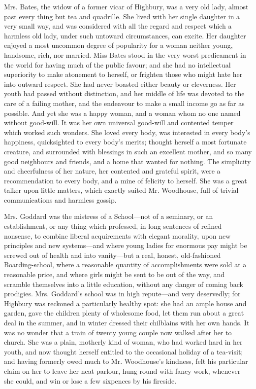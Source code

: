 Mrs. Bates, the widow of a former vicar of Highbury, was a very old lady, almost past every thing but tea and quadrille. She lived with her single daughter in a very small way, and was considered with all the regard and respect which a harmless old lady, under such untoward circumstances, can excite. Her daughter enjoyed a most uncommon degree of popularity for a woman neither young, handsome, rich, nor married. Miss Bates stood in the very worst predicament in the world for having much of the public favour; and she had no intellectual superiority to make atonement to herself, or frighten those who might hate her into outward respect. She had never boasted either beauty or cleverness. Her youth had passed without distinction, and her middle of life was devoted to the care of a failing mother, and the endeavour to make a small income go as far as possible. And yet she was a happy woman, and a woman whom no one named without good-will. It was her own universal good-will and contented temper which worked such wonders. She loved every body, was interested in every body's happiness, quicksighted to every body's merits; thought herself a most fortunate creature, and surrounded with blessings in such an excellent mother, and so many good neighbours and friends, and a home that wanted for nothing. The simplicity and cheerfulness of her nature, her contented and grateful spirit, were a recommendation to every body, and a mine of felicity to herself. She was a great talker upon little matters, which exactly suited Mr. Woodhouse, full of trivial communications and harmless gossip.

Mrs. Goddard was the mistress of a School---not of a seminary, or an establishment, or any thing which professed, in long sentences of refined nonsense, to combine liberal acquirements with elegant morality, upon new principles and new systems---and where young ladies for enormous pay might be screwed out of health and into vanity---but a real, honest, old-fashioned Boarding-school, where a reasonable quantity of accomplishments were sold at a reasonable price, and where girls might be sent to be out of the way, and scramble themselves into a little education, without any danger of coming back prodigies. Mrs. Goddard's school was in high repute---and very deservedly; for Highbury was reckoned a particularly healthy spot: she had an ample house and garden, gave the children plenty of wholesome food, let them run about a great deal in the summer, and in winter dressed their chilblains with her own hands. It was no wonder that a train of twenty young couple now walked after her to church. She was a plain, motherly kind of woman, who had worked hard in her youth, and now thought herself entitled to the occasional holiday of a tea-visit; and having formerly owed much to Mr. Woodhouse's kindness, felt his particular claim on her to leave her neat parlour, hung round with fancy-work, whenever she could, and win or lose a few sixpences by his fireside.

